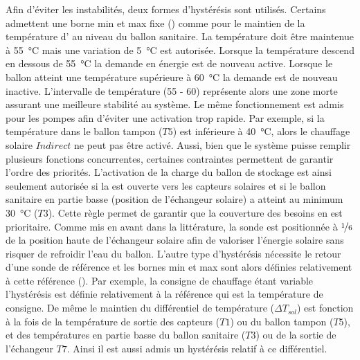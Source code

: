 Afin d’éviter les instabilités, deux formes d’hystérésis sont utilisés. Certains admettent une borne
min et max fixe () comme pour le maintien de la température
d’ au niveau du ballon sanitaire. La température doit être maintenue à \SI{55}{\celsius}
mais une variation de \SI{5}{\celsius} est autorisée. Lorsque la température descend en dessous de
\SI{55}{\celsius} la demande en énergie est de nouveau active. Lorsque le ballon atteint une
température supérieure à \SI{60}{\celsius} la demande est de nouveau inactive.
L’intervalle de température (\num{55} - \num{60}) représente alors une zone morte assurant
une meilleure stabilité au système. Le même fonctionnement est admis pour les pompes
afin d’éviter une activation trop rapide.
Par exemple, si la température dans le ballon tampon ($T5$) est inférieure à \SI{40}{\celsius},
alors le chauffage solaire $Indirect$ ne peut pas être activé. Aussi, bien que le système
puisse remplir plusieurs fonctions concurrentes, certaines contraintes permettent de
garantir l’ordre des priorités. L’activation de la charge du ballon de stockage est ainsi
seulement autorisée si la  est ouverte vers les capteurs solaires et si le ballon
sanitaire en partie basse (position de l’échangeur solaire) a atteint au minimum
\SI{30}{\celsius} ($T3$). Cette règle permet de garantir que la couverture des besoins en
 est prioritaire. Comme mis en avant dans la littérature, la sonde est positionnée
à $\nicefrac{1}{6}$ de la position haute de l’échangeur solaire afin de valoriser
l’énergie solaire sans risquer de refroidir l’eau du ballon.
L’autre type d’hystérésis nécessite le retour d’une sonde de référence et les bornes
min et max sont alors définies relativement à cette référence (). Par exemple, la consigne
de chauffage étant variable l’hystérésis est définie relativement à la référence
qui est la température de consigne. De même
le maintien du différentiel de température ($\Delta T_{sol}$) est fonction à la fois
de la température de sortie des capteurs ($T1$) ou du ballon tampon ($T5$), et des
températures en partie basse du ballon sanitaire ($T3$) ou de la sortie de l’échangeur
$T7$. Ainsi il est aussi admis un hystérésis relatif à ce différentiel.

